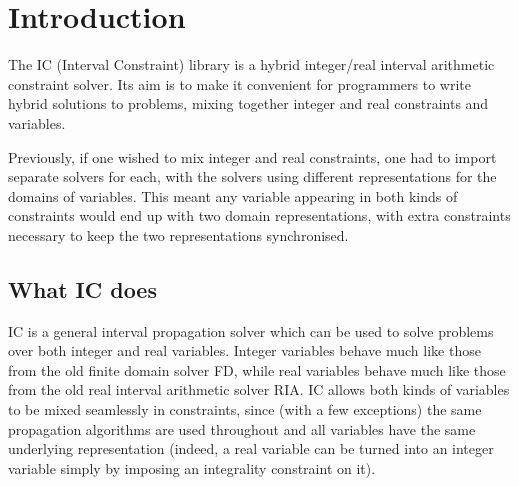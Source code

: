 %
% 
% 
% 
% 


\newcommand{\ignore}[1]{}


\section{Introduction}

The IC (Interval Constraint) library is a hybrid integer/real interval
arithmetic constraint solver.  Its aim is to make it convenient for
programmers to write hybrid solutions to problems, mixing together integer
and real constraints and variables.

Previously, if one wished to mix integer and real constraints, one had to
import separate solvers for each, with the solvers using different
representations for the domains of variables.  This meant any variable
appearing in both kinds of constraints would end up with two domain
representations, with extra constraints necessary to keep the two
representations synchronised.


\subsection{What IC does}

IC is a general interval propagation solver which can be used to solve
problems over both integer and real variables.  Integer variables behave
much like those from the old finite domain solver FD, while real variables
behave much like those from the old real interval arithmetic solver RIA.
IC allows both kinds of variables to be mixed seamlessly in constraints,
since (with a few exceptions) the same propagation algorithms are used
throughout and all variables have the same underlying representation
(indeed, a real variable can be turned into an integer variable simply by
imposing an integrality constraint on it).


